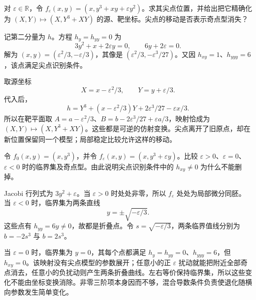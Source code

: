 \begin{exercise}\label{g2:ex:translated-cusp}
	对 \(\varepsilon\in\mathbb R\)，令 \(f_\varepsilon(x,y)=(x,y^3+xy+\varepsilon y^2)\)。求其尖点位置，并给出把它精确化为 \((X,Y)\mapsto(X,Y^3+XY)\) 的源、靶坐标。尖点的移动是否表示奇点型消失？
\end{exercise}
\begin{solution}
	记第二分量为 \(h\)。方程 \(h_y=h_{yy}=0\) 为
	\[
		3y^2+x+2\varepsilon y=0,\qquad 6y+2\varepsilon=0.
	\]
	解为 \((x,y)=(\varepsilon^2/3,-\varepsilon/3)\)，其像是 \((\varepsilon^2/3,-\varepsilon^3/27)\)。又因 \(h_{xy}=1\)、\(h_{yyy}=6\)，该点满足尖点识别条件。

	取源坐标
	\[
		X=x-\varepsilon^2/3,\qquad Y=y+\varepsilon/3.
	\]
	代入后，
	\[
		h=Y^3+(x-\varepsilon^2/3)Y+2\varepsilon^3/27-\varepsilon x/3.
	\]
	所以在靶平面取 \(A=a-\varepsilon^2/3\)、\(B=b-2\varepsilon^3/27+\varepsilon a/3\)，映射恰成为 \((X,Y)\mapsto(X,Y^3+XY)\)。这些都是可逆的仿射变换。尖点离开了旧原点，却在新位置保留同一个模型；局部稳定比较允许这样的移动。
\end{solution}

\begin{exercise}\label{g2:ex:degenerate-cubic-unfolding}
	令 \(f_0(x,y)=(x,y^3)\)，并令 \(f_\varepsilon(x,y)=(x,y^3+\varepsilon y)\)。比较 \(\varepsilon>0\)、\(\varepsilon=0\)、\(\varepsilon<0\) 时的临界集及奇点型。由此说明尖点识别条件中的 \(h_{xy}\ne0\) 为什么不能删掉。
\end{exercise}
\begin{solution}
	Jacobi 行列式为 \(3y^2+\varepsilon\)。当 \(\varepsilon>0\) 时处处非零，所以 \(f_\varepsilon\) 处处为局部微分同胚。当 \(\varepsilon<0\) 时，临界集为两条直线
	\[
		y=\pm\sqrt{-\varepsilon/3}.
	\]
	这些点有 \(h_{yy}=6y\ne0\)，故都是折叠点。令 \(s=\sqrt{-\varepsilon/3}\)，两条临界值线分别为 \(b=-2s^3\) 与 \(b=2s^3\)。

	当 \(\varepsilon=0\) 时，临界集为 \(y=0\)，其每个点都满足 \(h_y=h_{yy}=0\)、\(h_{yyy}=6\)，但 \(h_{xy}=0\)。该映射没有尖点模型的参数展开；任意小的正 \(\varepsilon\) 扰动就能把附近全部奇点消去，任意小的负扰动则产生两条折叠曲线。左右等价保持临界集，所以这些变化不能由坐标变换消除。非零三阶项本身因而不够，混合导数条件负责使退化随横向参数发生简单变化。
\end{solution}

